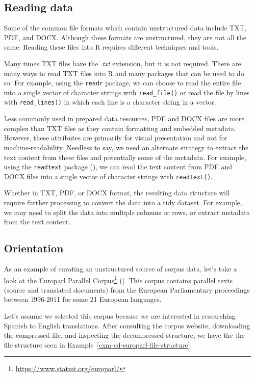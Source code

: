 \documentclass[
  letterpaper,
]{latex/krantz}
\theoremstyle{definition}
\theoremstyle{remark}
\DeclareRobustCommand{\href}[2]{#2\footnote{\url{#1}}}
\begin{document}
\subsection{Reading data}\label{reading-data}

Some of the common file formats which contain unstructured data include
TXT, PDF, and DOCX. Although these formats are unstructured, they are
not all the same. Reading these files into R requires different
techniques and tools.

Many times TXT files have the \emph{.txt} extension, but it is not
required. There are many ways to read TXT files into R and many packages
that can be used to do so. For example, using the \texttt{readr}
package, we can choose to read the entire file into a single vector of
character strings with \texttt{read\_file()} or read the file by lines
with \texttt{read\_lines()} in which each line is a character string in
a vector.

Less commonly used in prepared data resources, PDF and DOCX files are
more complex than TXT files as they contain formatting and embedded
metadata. However, these attributes are primarily for visual
presentation and not for machine-readability. Needless to say, we need
an alternate strategy to extract the text content from these files and
potentially some of the metadata. For example, using the
\texttt{readtext} package (), we can read the text content from PDF and DOCX files into a
single vector of character strings with \texttt{readtext()}.

Whether in TXT, PDF, or DOCX format, the resulting data structure will
require further processing to convert the data into a tidy dataset. For
example, we may need to split the data into multiple columns or rows, or
extract metadata from the text content.

\subsection{Orientation}\label{orientation}

As an example of curating an unstructured source of corpus data, let's
take a look at the \href{https://www.statmt.org/europarl/}{Europarl
Parallel Corpus} (). This corpus
contains parallel texts (source and translated documents) from the
European Parliamentary proceedings between 1996-2011 for some 21
European languages.

Let's assume we selected this corpus because we are interested in
researching Spanish to English translations. After consulting the corpus
website, downloading the compressed file, and inspecting the
decompressed structure, we have the the file structure seen in
Example~\ref{exm-cd-europarl-file-structure}.
\end{document}
